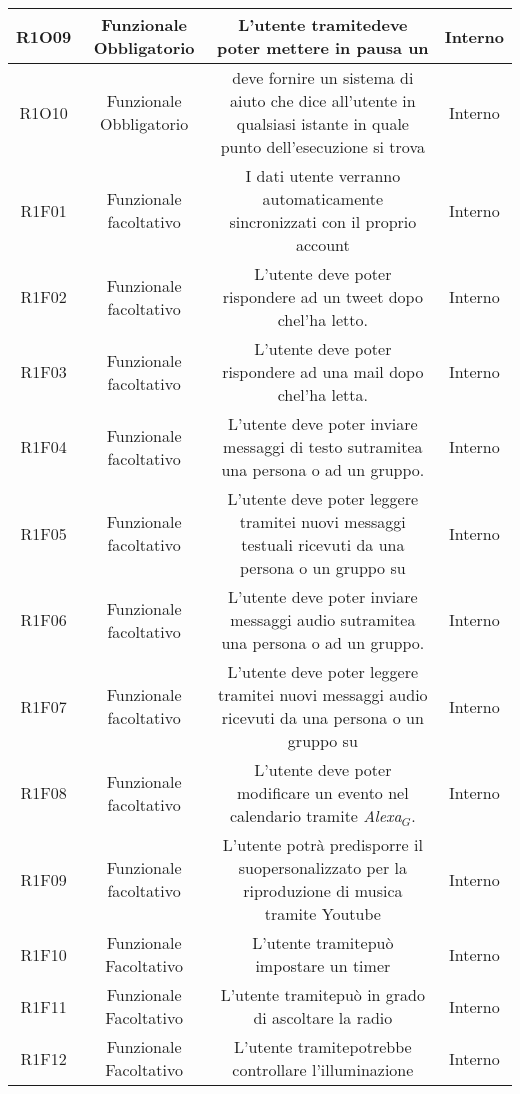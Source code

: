 \begin{tabularx}{\textwidth}{|C|C|C|C|}
	\hline
	R1O09&Funzionale Obbligatorio  &L'utente tramitedeve poter mettere in pausa un &Interno \\
	\hline
	R1O10&Funzionale Obbligatorio&deve fornire un sistema di aiuto che dice all'utente in qualsiasi istante in quale punto dell'esecuzione si trova & Interno\\
	\hline
	R1F01 & Funzionale facoltativo & I dati utente verranno automaticamente sincronizzati con il proprio account & Interno\\
	\hline
	R1F02 & Funzionale facoltativo & L'utente deve poter rispondere ad un tweet dopo chel'ha letto. & Interno\\
	\hline
	R1F03 & Funzionale facoltativo & L'utente deve poter rispondere ad una mail dopo chel'ha letta. & Interno\\
	\hline
	R1F04 & Funzionale facoltativo & L'utente deve poter inviare messaggi di testo sutramitea una persona o ad un gruppo. & Interno\\
	\hline
	R1F05 & Funzionale facoltativo & L'utente deve poter leggere tramitei nuovi messaggi testuali ricevuti da una persona o un gruppo su  & Interno\\
	\hline
	R1F06 & Funzionale facoltativo & L'utente deve poter inviare messaggi audio sutramitea una persona o ad un gruppo.  & Interno\\
	\hline
	R1F07 & Funzionale facoltativo & L'utente deve poter leggere tramitei nuovi messaggi audio ricevuti da una persona o un gruppo su   & Interno\\
	\hline
	R1F08 & Funzionale facoltativo & L'utente deve poter modificare un evento nel calendario tramite \textit{Alexa$_{G}$}. & Interno\\
	\hline
	R1F09 & Funzionale facoltativo & L'utente potrà predisporre il suopersonalizzato per la riproduzione di musica tramite Youtube & Interno\\
	\hline
	R1F10&Funzionale Facoltativo  &L'utente tramitepuò impostare un timer &Interno \\
	\hline
	R1F11&Funzionale Facoltativo  &L'utente tramitepuò in grado di ascoltare la radio &Interno \\
	\hline	
	R1F12&Funzionale Facoltativo  &L'utente tramitepotrebbe controllare l'illuminazione &Interno \\

\end{tabularx}
